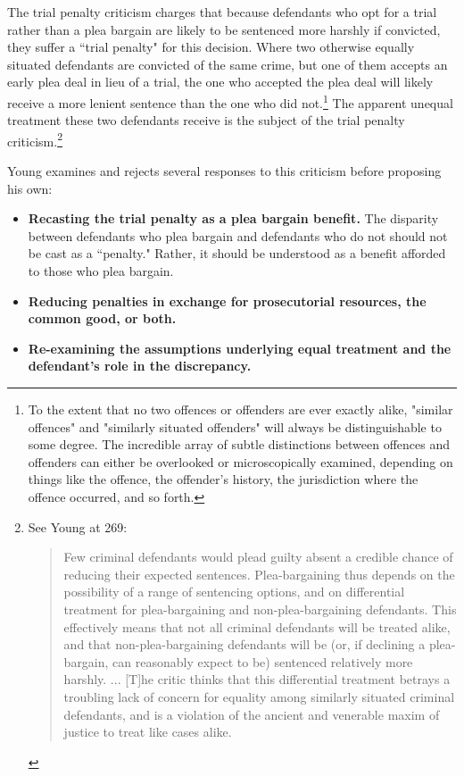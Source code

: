 The trial penalty criticism charges that because defendants who opt for a trial rather than a plea bargain are likely to be sentenced more harshly if convicted, they suffer a ``trial penalty" for this decision. Where two otherwise equally situated defendants are convicted of the same crime, but one of them accepts an early plea deal in lieu of a trial, the one who accepted the plea deal will likely receive a more lenient sentence than the one who did not.\footnote{To the extent that no two offences or offenders are ever exactly alike, "similar offences" and "similarly  situated offenders" will always be distinguishable to some degree. The incredible array of subtle distinctions between offences and offenders can either be overlooked or microscopically examined, depending on things like the offence, the offender's history, the jurisdiction where the offence occurred, and so forth.} The apparent unequal treatment these two defendants receive is the subject of the trial penalty criticism.\footnote{See Young at 269: 
\begin{quote}
    Few criminal defendants would plead guilty absent a credible chance of reducing their expected sentences. Plea-bargaining thus depends on the possibility of a range of sentencing options, and on differential treatment for plea-bargaining and non-plea-bargaining defendants. This effectively means that not all criminal defendants will be treated alike, and that non-plea-bargaining defendants will be (or, if declining a plea-bargain, can reasonably expect to be) sentenced relatively more harshly. ... [T]he critic thinks that this differential treatment betrays a troubling lack of concern for equality among similarly situated criminal defendants, and is a violation of the ancient and venerable maxim of justice to treat like cases alike.
\end{quote}}

Young examines and rejects several responses to this criticism before proposing his own:

\begin{itemize}
    \item \textbf{Recasting the trial penalty as a plea bargain benefit.} The disparity between defendants who plea bargain and defendants who do not should not be cast as a ``penalty." Rather, it should be understood as a benefit afforded to those who plea bargain.
    \item \textbf{Reducing penalties in exchange for prosecutorial resources, the common good, or both.} 
    \item \textbf{Re-examining the assumptions underlying equal treatment and the defendant's role in the discrepancy.} 
\end{itemize}

